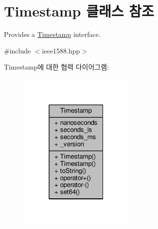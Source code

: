 \hypertarget{class_timestamp}{}\section{Timestamp 클래스 참조}
\label{class_timestamp}


Provides a \hyperlink{class_timestamp}{Timestamp} interface.  




{\ttfamily \#include $<$ieee1588.\+hpp$>$}



Timestamp에 대한 협력 다이어그램\+:
\nopagebreak
\begin{figure}[H]
\begin{center}
\leavevmode
\includegraphics[width=163pt]{class_timestamp__coll__graph}
\end{center}
\end{figure}

